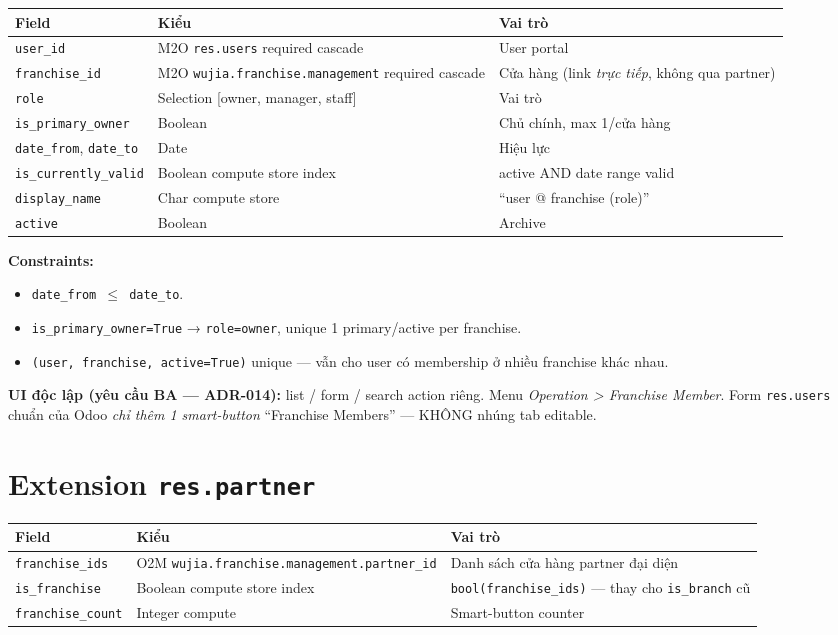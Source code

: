 \begin{longtable}{p{5cm} p{4cm} p{6cm}}
\toprule
\textbf{Field} & \textbf{Kiểu} & \textbf{Vai trò} \\
\midrule
\endhead
\texttt{user\_id} & M2O \texttt{res.users} required cascade & User portal \\
\texttt{franchise\_id} & M2O \texttt{wujia.franchise.management} required cascade & Cửa hàng (link \emph{trực tiếp}, không qua partner) \\
\texttt{role} & Selection [owner, manager, staff] & Vai trò \\
\texttt{is\_primary\_owner} & Boolean & Chủ chính, max 1/cửa hàng \\
\texttt{date\_from}, \texttt{date\_to} & Date & Hiệu lực \\
\texttt{is\_currently\_valid} & Boolean compute store index & active AND date range valid \\
\texttt{display\_name} & Char compute store & ``user @ franchise (role)'' \\
\texttt{active} & Boolean & Archive \\
\bottomrule
\end{longtable}

\textbf{Constraints:}
\begin{itemize}
    \item \texttt{date\_from $\leq$ date\_to}.
    \item \texttt{is\_primary\_owner=True} → \texttt{role=owner}, unique 1 primary/active per franchise.
    \item \texttt{(user, franchise, active=True)} unique --- vẫn cho user có membership ở nhiều franchise khác nhau.
\end{itemize}

\textbf{UI độc lập (yêu cầu BA --- ADR-014):} list / form / search action riêng. Menu \emph{Operation > Franchise Member}. Form \texttt{res.users} chuẩn của Odoo \emph{chỉ thêm 1 smart-button} ``Franchise Members'' --- KHÔNG nhúng tab editable.

\section{Extension \texttt{res.partner}}

\begin{longtable}{p{4cm} p{4cm} p{7cm}}
\toprule
\textbf{Field} & \textbf{Kiểu} & \textbf{Vai trò} \\
\midrule
\endhead
\texttt{franchise\_ids} & O2M \texttt{wujia.franchise.management.partner\_id} & Danh sách cửa hàng partner đại diện \\
\texttt{is\_franchise} & Boolean compute store index & \texttt{bool(franchise\_ids)} --- thay cho \texttt{is\_branch} cũ \\
\texttt{franchise\_count} & Integer compute & Smart-button counter \\
\bottomrule
\end{longtable}


